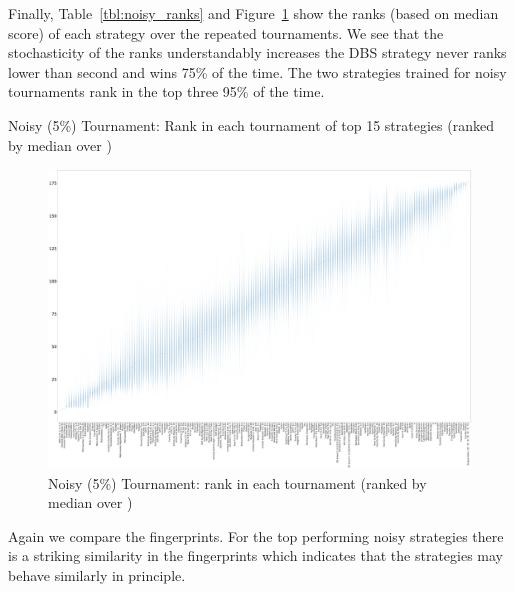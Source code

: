 \documentclass{article}
\begin{document}
Finally, Table~\ref{tbl:noisy_ranks} and
Figure~\ref{fig:noisy_ranks_boxplot} show the ranks (based on median score)
of each strategy over the repeated tournaments. We see that the stochasticity
of the ranks understandably increases the DBS strategy never ranks lower than
second and wins 75\% of the time. The two strategies trained for noisy
tournaments rank in the top three 95\% of the time.

\begin{table}[!hbtp]
    \centering
        
        \caption{Noisy (5\%) Tournament: Rank in each tournament
        of top 15 strategies (ranked by median over
        \protecttournaments)}
        \label{tbl:noisy_ranks}
\end{table}

\begin{landscape}
    \begin{figure}[!hbtp]
        \centering
        \includegraphics[width=\paperwidth]{./assets/noisy_ranks_boxplots.pdf}
        \caption{Noisy (5\%) Tournament: rank in each tournament (ranked by
        median over
        \protecttournaments)}
        \label{fig:noisy_ranks_boxplot}
    \end{figure}
\end{landscape}

Again we compare the fingerprints. For the top performing noisy strategies there
is a striking similarity in the fingerprints which indicates that the strategies
may behave similarly in principle.
\end{document}
